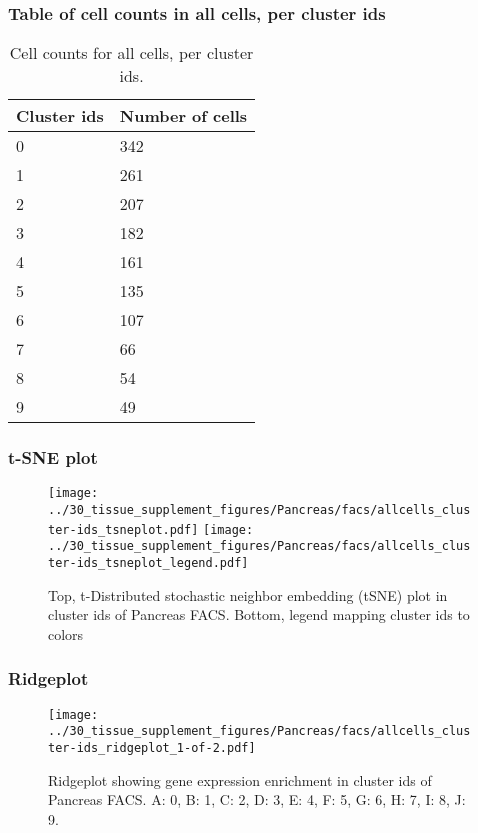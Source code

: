 \subsubsection{Table of cell counts in all cells, per cluster ids}\begin{table}[h]
\centering
\label{my-label}
\begin{tabular}{@{}ll@{}}
\toprule

Cluster ids& Number of cells \\ \midrule
0 & 342 \\

1 & 261 \\

2 & 207 \\

3 & 182 \\

4 & 161 \\

5 & 135 \\

6 & 107 \\

7 & 66 \\

8 & 54 \\

9 & 49 \\
\bottomrule
\end{tabular}
\caption{Cell counts for all cells, per cluster ids.}
\end{table}

\newpage
\subsubsection{t-SNE plot}
\begin{figure}[h]
\centering
\texttt{[image: ../30\_tissue\_supplement\_figures/Pancreas/facs/allcells\_cluster-ids\_tsneplot.pdf]}
\texttt{[image: ../30\_tissue\_supplement\_figures/Pancreas/facs/allcells\_cluster-ids\_tsneplot\_legend.pdf]}
\caption{Top, t-Distributed stochastic neighbor embedding (tSNE) plot  in cluster ids of Pancreas FACS. Bottom, legend mapping cluster ids to colors}
\end{figure}


\newpage
\newpage
\subsubsection{Ridgeplot}
\begin{figure}[h]
\centering
\texttt{[image: ../30\_tissue\_supplement\_figures/Pancreas/facs/allcells\_cluster-ids\_ridgeplot\_1-of-2.pdf]}

\caption{ Ridgeplot  showing gene expression enrichment in cluster ids of Pancreas FACS. A: 0, B: 1, C: 2, D: 3, E: 4, F: 5, G: 6, H: 7, I: 8, J: 9.}
\end{figure}


